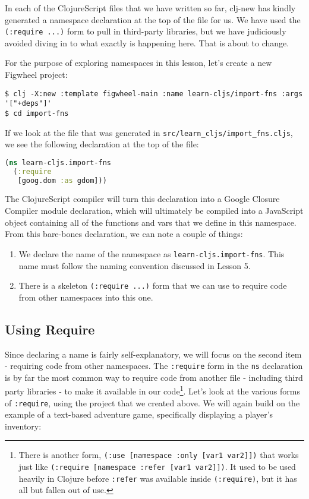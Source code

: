 \documentclass[10pt,twoside,openright]{memoir}
\begin{document}
In each of the ClojureScript files that we have written so far, clj-new
has kindly generated a namespace declaration at the top of the file for
us. We have used the \texttt{(:require\ ...)} form to pull in
third-party libraries, but we have judiciously avoided diving in to what
exactly is happening here. That is about to change.

For the purpose of exploring namespaces in this lesson, let's create a
new Figwheel project:

\begin{verbatim}
$ clj -X:new :template figwheel-main :name learn-cljs/import-fns :args '["+deps"]'
$ cd import-fns
\end{verbatim}

If we look at the file that was generated in
\texttt{src/learn\_cljs/import\_fns.cljs}, we see the following
declaration at the top of the file:

\begin{lstlisting}[language=Clojure]
(ns learn-cljs.import-fns
  (:require
   [goog.dom :as gdom]))
\end{lstlisting}

The ClojureScript compiler will turn this declaration into a Google
Closure Compiler module declaration, which will ultimately be compiled
into a JavaScript object containing all of the functions and vars that
we define in this namespace. From this bare-bones declaration, we can
note a couple of things:

\begin{enumerate}
\def\labelenumi{\arabic{enumi}.}
\tightlist
\item
  We declare the name of the namespace as
  \texttt{learn-cljs.import-fns}. This name must follow the naming
  convention discussed in Lesson 5.
\item
  There is a skeleton \texttt{(:require\ ...)} form that we can use to
  require code from other namespaces into this one.
\end{enumerate}


\subsection{Using Require}

Since declaring a name is fairly self-explanatory, we will focus on the
second item - requiring code from other namespaces. The
\texttt{:require} form in the \texttt{ns} declaration is by far the most
common way to require code from another file - including third party
libraries - to make it available in our code\footnote{There is another
  form, \texttt{(:use\ {[}namespace\ :only\ {[}var1\ var2{]}{]})} that
  works just like
  \texttt{(:require\ {[}namespace\ :refer\ {[}var1\ var2{]}{]})}. It
  used to be used heavily in Clojure before \texttt{:refer} was
  available inside \texttt{(:require)}, but it has all but fallen out of
  use.}. Let's look at the various forms of \texttt{:require}, using the
project that we created above. We will again build on the example of a
text-based adventure game, specifically displaying a player's inventory:
\end{document}

